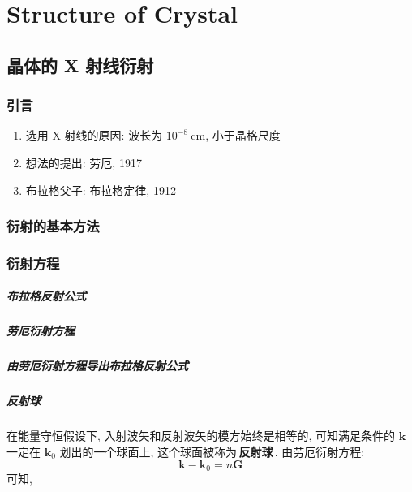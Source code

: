 \chapter{Structure of Crystal}

\section{晶体的 X 射线衍射}
    \subsection{引言}
        \begin{enumerate}
            \item 选用 X 射线的原因: 波长为 $10^{-8}\ \mathrm{cm}$, 小于晶格尺度
            \item 想法的提出: 劳厄, 1917
            \item 布拉格父子: 布拉格定律, 1912
        \end{enumerate}

    \subsection{衍射的基本方法}

    \subsection{衍射方程}
        \paragraph{布拉格反射公式 \\}

        \paragraph{劳厄衍射方程 \\}

        \paragraph{由劳厄衍射方程导出布拉格反射公式 \\}

        \paragraph{反射球 \\}
            \hspace*{2em} 在能量守恒假设下, 入射波矢和反射波矢的模方始终是相等的, 可知满足条件的 $\bm{k}$ 一定在 $\bm{k}_0$ 划出的一个球面上, 这个球面被称为\,\textbf{反射球}\,. 由劳厄衍射方程:
                \begin{equation}
                    \bm{k} - \bm{k}_0 = n \bm{G}
                \end{equation}
            可知, 
